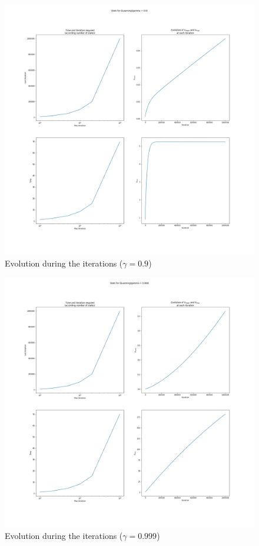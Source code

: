 \documentclass[11pt]{article}
\begin{document}
\begin{multicols}{2}
\begin{figure}[H]
\centering
\includegraphics[width = \columnwidth]{Q_FM_0.9.png}
\caption{Evolution during the iterations ($\gamma = 0.9$)}
\end{figure}

\begin{figure}[H]
\centering
\includegraphics[width = \columnwidth]{Q_FM_0.999.png}
\caption{Evolution during the iterations ($\gamma = 0.999$)}
\end{figure}


\end{multicols}
\end{document}
